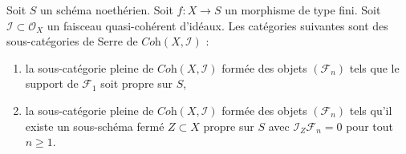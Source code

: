 \begin{lemma}
\label{lemma-systems-with-proper-support}
Soit $S$ un schéma noethérien. Soit $f : X \to S$ un morphisme de type fini.
Soit $\mathcal{I} \subset \mathcal{O}_X$
un faisceau quasi-cohérent d'idéaux. Les catégories suivantes sont des sous-catégories de Serre
de $\textit{Coh}(X, \mathcal{I})$ :
\begin{enumerate}
\item la sous-catégorie pleine de $\textit{Coh}(X, \mathcal{I})$
formée des objets $(\mathcal{F}_n)$ tels que
le support de $\mathcal{F}_1$ soit propre sur $S$,
\item la sous-catégorie pleine de $\textit{Coh}(X, \mathcal{I})$
formée des objets $(\mathcal{F}_n)$ tels
qu'il existe un sous-schéma fermé $Z \subset X$ propre sur $S$
avec $\mathcal{I}_Z \mathcal{F}_n = 0$ pour tout $n \geq 1$.
\end{enumerate}
\end{lemma}

